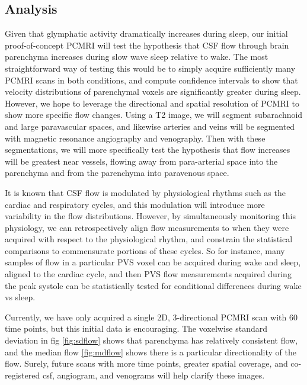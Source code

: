 
\subsection*{Analysis}
Given that glymphatic activity dramatically increases during sleep, our initial proof-of-concept PCMRI will test the hypothesis that CSF flow through brain parenchyma increases during slow wave sleep relative to wake. The most straightforward way of testing this would be to simply acquire sufficiently many PCMRI scans in both conditions, and compute confidence intervals to show that velocity distributions of parenchymal voxels are significantly greater during sleep. However, we hope to leverage the directional and spatial resolution of PCMRI to show more specific flow changes. Using a T2 image, we will segment subarachnoid and large paravascular spaces, and likewise arteries and veins will be segmented with magnetic resonance angiography and venography. Then with these segmentations, we will more specifically test the hypothesis that flow increases will be greatest near vessels, flowing away from para-arterial space into the parenchyma and from the parenchyma into paravenous space.

It is known that CSF flow is modulated by physiological rhythms such as the cardiac and respiratory cycles, and this modulation will introduce more variability in the flow distributions. However, by simultaneously monitoring this physiology, we can retrospectively align flow measurements to when they were acquired with respect to the physiological rhythm, and constrain the statistical comparisons to commensurate portions of these cycles. So for instance, many samples of flow in a particular PVS voxel can be acquired during wake and sleep, aligned to the cardiac cycle, and then PVS flow measurements acquired during the peak systole can be statistically tested for conditional differences during wake vs sleep.

Currently, we have only acquired a single 2D, 3-directional PCMRI scan with 60 time points, but this initial data is encouraging. The voxelwise standard deviation in fig \ref{fig:sdflow} shows that parenchyma has relatively consistent flow, and the median flow \ref{fig:mdflow} shows there is a particular directionality of the flow. Surely, future scans with more time points, greater spatial coverage, and co-registered csf, angiogram, and venograms will help clarify these images.

